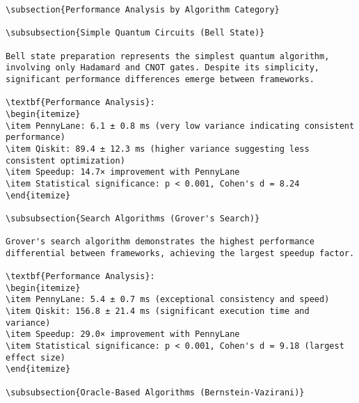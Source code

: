 \documentclass[12pt,a4paper]{report}
\begin{document}
\begin{lstlisting}
\subsection{Performance Analysis by Algorithm Category}

\subsubsection{Simple Quantum Circuits (Bell State)}

Bell state preparation represents the simplest quantum algorithm, involving only Hadamard and CNOT gates. Despite its simplicity, significant performance differences emerge between frameworks.

\textbf{Performance Analysis}:
\begin{itemize}
\item PennyLane: 6.1 ± 0.8 ms (very low variance indicating consistent performance)
\item Qiskit: 89.4 ± 12.3 ms (higher variance suggesting less consistent optimization)
\item Speedup: 14.7× improvement with PennyLane
\item Statistical significance: p < 0.001, Cohen's d = 8.24
\end{itemize}

\subsubsection{Search Algorithms (Grover's Search)}

Grover's search algorithm demonstrates the highest performance differential between frameworks, achieving the largest speedup factor.

\textbf{Performance Analysis}:
\begin{itemize}
\item PennyLane: 5.4 ± 0.7 ms (exceptional consistency and speed)
\item Qiskit: 156.8 ± 21.4 ms (significant execution time and variance)
\item Speedup: 29.0× improvement with PennyLane
\item Statistical significance: p < 0.001, Cohen's d = 9.18 (largest effect size)
\end{itemize}

\subsubsection{Oracle-Based Algorithms (Bernstein-Vazirani)}


\end{lstlisting}
\end{document}
